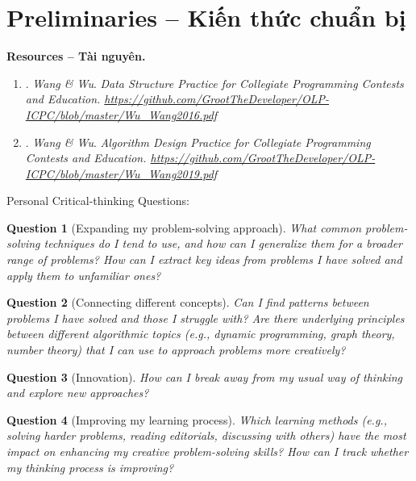 \documentclass{article}
\newtheorem{question}{Question}
\begin{document}

\section{Preliminaries -- Kiến thức chuẩn bị}

\textbf{\textsf{Resources -- Tài nguyên.}}
\begin{enumerate}
	\item \cite{WANG_WU2016}. {\it Wang \it\& Wu}. \it Data Structure Practice for Collegiate Programming Contests and Education. \url{https://github.com/GrootTheDeveloper/OLP-ICPC/blob/master/Wu_Wang2016.pdf}
    	\item \cite{WANG_WU2019}. {\it Wang \it\& Wu}. \it Algorithm Design Practice for Collegiate Programming Contests and Education. \url{https://github.com/GrootTheDeveloper/OLP-ICPC/blob/master/Wu_Wang2019.pdf}

\end{enumerate}
Personal Critical-thinking Questions:
\begin{question}[Expanding my problem-solving approach]
What common problem-solving techniques do I tend to use, and how can I generalize them for a broader range of problems?
How can I extract key ideas from problems I have solved and apply them to unfamiliar ones?

\end{question}

\begin{question}[Connecting different concepts]
	Can I find patterns between problems I have solved and those I struggle with? Are there underlying principles between different algorithmic topics (e.g., dynamic programming, graph theory, number theory) that I can use to approach problems more creatively?
\end{question}

\begin{question}[Innovation]
	 How can I break away from my usual way of thinking and explore new approaches?
\end{question}

\begin{question}[Improving my learning process]
Which learning methods (e.g., solving harder problems, reading editorials, discussing with others) have the most impact on enhancing my creative problem-solving skills? How can I track whether my thinking process is improving?
\end{question}
\end{document}

